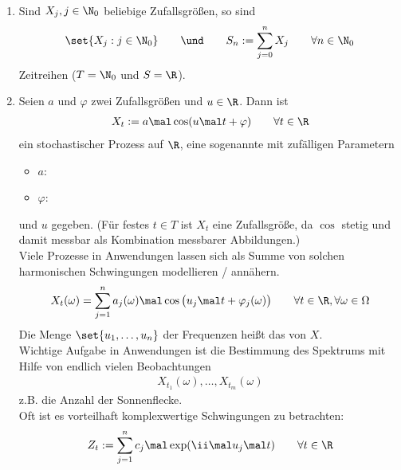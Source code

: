 \begin{beispiel}\label{beisp1.3.3}\
	\begin{enumerate}[label=(\alph*)]
		\item Sind $X_j,j\in\N_0$ beliebige Zufallsgrößen, so sind 
		\begin{align*}
			\set{X_j:j\in\N_0}
			\qquad\und\qquad
			S_n:=\sum\limits_{j=0}^n X_j\qquad\forall n\in\N_0
		\end{align*}
		Zeitreihen ($T=\N_0$ und $S=\R$).
		\item Seien $a$ und $\varphi$ zwei Zufallsgrößen und $u\in\R$.
		Dann ist 
		\begin{align*}
			X_t:=a\mal\cos(u\mal t+\varphi)\qquad\forall t\in\R
		\end{align*}
		ein stochastischer Prozess auf $\R$, eine sogenannte  mit zufälligen Parametern
		\begin{itemize}
			\item $a$: 
			\item $\varphi$: 
		\end{itemize}
		und  $u$ gegeben.
		(Für festes $t\in T$ ist $X_t$ eine Zufallsgröße, da $\cos$ stetig und damit messbar als Kombination messbarer Abbildungen.)\\
		Viele Prozesse in Anwendungen lassen sich als Summe von solchen harmonischen Schwingungen modellieren / annähern.
		\begin{align*}
			X_t(\omega)=\sum\limits_{j=1}^n a_j(\omega)\mal\cos\big(u_j\mal t+\varphi_j(\omega)\big)\qquad\forall t\in\R,\forall\omega\in\Omega
		\end{align*}
		Die Menge $\set{u_1,\ldots,u_n}$ der Frequenzen heißt das  von $X$. \\
		Wichtige Aufgabe in Anwendungen ist die Bestimmung des Spektrums mit Hilfe von endlich vielen Beobachtungen 
		\begin{align*}
			X_{t_1}(\omega),\ldots,X_{t_m}(\omega)
		\end{align*}
		z.B. die Anzahl der Sonnenflecke.\\
		Oft ist es vorteilhaft komplexwertige Schwingungen zu betrachten:
		\begin{align}\label{eq:beispiel1.3.3HarmonischeSchwingungKomplex}
			Z_t:=\sum\limits_{j=1}^n c_j\mal\exp(\ii\mal u_j\mal t)\qquad\forall t\in\R
		\end{align}
	\end{enumerate}
\end{beispiel}




